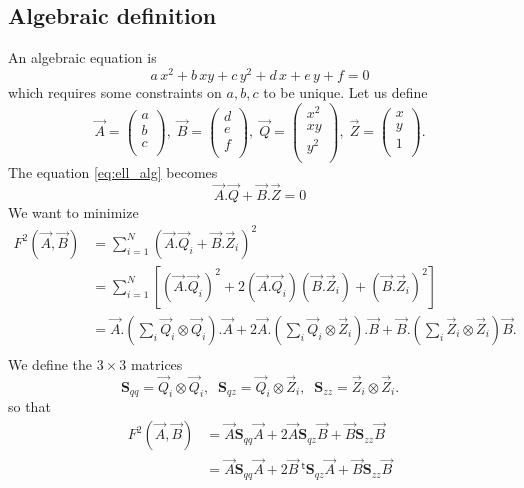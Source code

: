 \documentclass[aps]{revtex4}
\newcommand{\mymat}[1]{\boldsymbol{#1}}
\newcommand{\mytrn}[1]{~^{\mathsf{t}}\!{#1}}
\begin{document}
\subsection{Algebraic definition}
An algebraic equation is
\begin{equation}
\label{eq:ell_alg}
	a\,x^2+b\,xy+c\,y^2 + d\,x+e\,y+f = 0
\end{equation}
which requires some constraints on $a,b,c$ to be unique.
Let us define 
\begin{equation}
	\vec{A} = 
	\begin{pmatrix}
	a\\
	b\\
	c\\
	\end{pmatrix},\;
	\vec{B} = 
	\begin{pmatrix}
	d\\
	e\\
	f\\
	\end{pmatrix},\;
	\vec{Q} =
	\begin{pmatrix}
	x^2\\
	xy\\
	y^2\\
	\end{pmatrix},\;
	\vec{Z} =
	\begin{pmatrix}
	x\\
	y\\
	1\\
	\end{pmatrix}.
\end{equation}
The equation \eqref{eq:ell_alg} becomes
\begin{equation}
	\vec{A}.\vec{Q} + \vec{B}.\vec{Z} = 0
\end{equation}
We want to minimize
\begin{align}
	F^2\left(\vec{A},\vec{B}\right) & = \sum_{i=1}^N \left(\vec{A}.\vec{Q}_i + \vec{B}.\vec{Z}_i\right)^2\\
	& =  \sum_{i=1}^N \left\lbrack
	\left(\vec{A}.\vec{Q}_i\right)^2 + 2 \left(\vec{A}.\vec{Q}_i\right)\left(\vec{B}.\vec{Z}_i\right) + \left(\vec{B}.\vec{Z}_i\right)^2
	\right\rbrack\\
	& = \vec{A}.\left(\sum_i \vec{Q}_i\otimes\vec{Q}_i\right).\vec{A} +
	 2 \vec{A}.\left(\sum_i \vec{Q}_i\otimes\vec{Z}_i\right).\vec{B} + \vec{B}.\left(\sum_i \vec{Z}_i\otimes\vec{Z}_i\right)\vec{B}.\\
\end{align}
We define the $3\times3$ matrices
\begin{equation}
	\mymat{S}_{qq} =  \vec{Q}_i\otimes\vec{Q}_i,\;\;\mymat{S}_{qz}=\vec{Q}_i\otimes\vec{Z}_i,\;\;\mymat{S}_{zz}=\vec{Z}_i\otimes\vec{Z}_i.
\end{equation}
so that
\begin{align}
	F^2\left(\vec{A},\vec{B}\right)  & = \vec{A}\mymat{S}_{qq}\vec{A} + 2\vec{A}\mymat{S}_{qz}\vec{B} + \vec{B}\mymat{S}_{zz}\vec{B}\\
	 & = \vec{A}\mymat{S}_{qq}\vec{A} + 2\vec{B}\mytrn{\mymat{S}_{qz}}\vec{A} + \vec{B}\mymat{S}_{zz}\vec{B}
\end{align}
\end{document}
